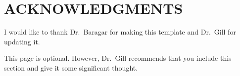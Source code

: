 \chapter*{ACKNOWLEDGMENTS}

I would like to thank Dr.\ Baragar for making this template and Dr.\ Gill for updating it. 

This page is optional. However, Dr.\ Gill recommends that you include this section and give it some significant thought. 


